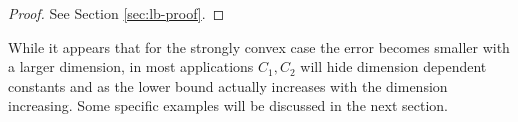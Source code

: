 \begin{proof}
 See Section \ref{sec:lb-proof}.
\end{proof}
While it appears that for the strongly convex case the error becomes smaller with a larger dimension, 
in most applications $C_1, C_2$ will hide dimension dependent constants 
and as the lower bound actually increases with the dimension increasing.
Some specific examples will be discussed in the next section.






